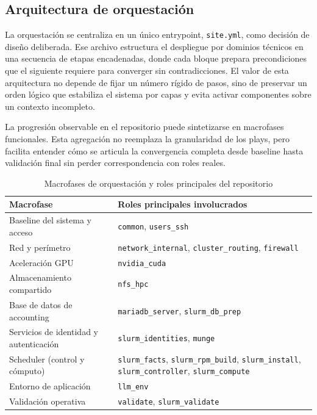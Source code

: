 \subsection{Arquitectura de orquestación}

La orquestación se centraliza en un único entrypoint, \texttt{site.yml}, como decisión de diseño deliberada. Ese archivo estructura el despliegue por dominios técnicos en una secuencia de etapas encadenadas, donde cada bloque prepara precondiciones que el siguiente requiere para converger sin contradicciones. El valor de esta arquitectura no depende de fijar un número rígido de pasos, sino de preservar un orden lógico que estabiliza el sistema por capas y evita activar componentes sobre un contexto incompleto.

La progresión observable en el repositorio puede sintetizarse en macrofases funcionales. Esta agregación no reemplaza la granularidad de los plays, pero facilita entender cómo se articula la convergencia completa desde baseline hasta validación final sin perder correspondencia con roles reales.

\begin{table}[H]
\centering
\caption{Macrofases de orquestación y roles principales del repositorio}
\label{tab:modelo_orquestacion_macrofases}
\begin{tabular}{|>{\raggedright\arraybackslash}p{}|>{\raggedright\arraybackslash}p{}|}
\hline
\textbf{Macrofase} & \textbf{Roles principales involucrados} \\
\hline
Baseline del sistema y acceso & \texttt{common}, \texttt{users\_ssh} \\
\hline
Red y perímetro & \texttt{network\_internal}, \texttt{cluster\_routing}, \texttt{firewall} \\
\hline
Aceleración GPU & \texttt{nvidia\_cuda} \\
\hline
Almacenamiento compartido & \texttt{nfs\_hpc} \\
\hline
Base de datos de accounting & \texttt{mariadb\_server}, \texttt{slurm\_db\_prep} \\
\hline
Servicios de identidad y autenticación & \texttt{slurm\_identities}, \texttt{munge} \\
\hline
Scheduler (control y cómputo) & \texttt{slurm\_facts}, \texttt{slurm\_rpm\_build}, \texttt{slurm\_install}, \texttt{slurm\_controller}, \texttt{slurm\_compute} \\
\hline
Entorno de aplicación & \texttt{llm\_env} \\
\hline
Validación operativa & \texttt{validate}, \texttt{slurm\_validate} \\
\hline
\end{tabular}
\end{table}

